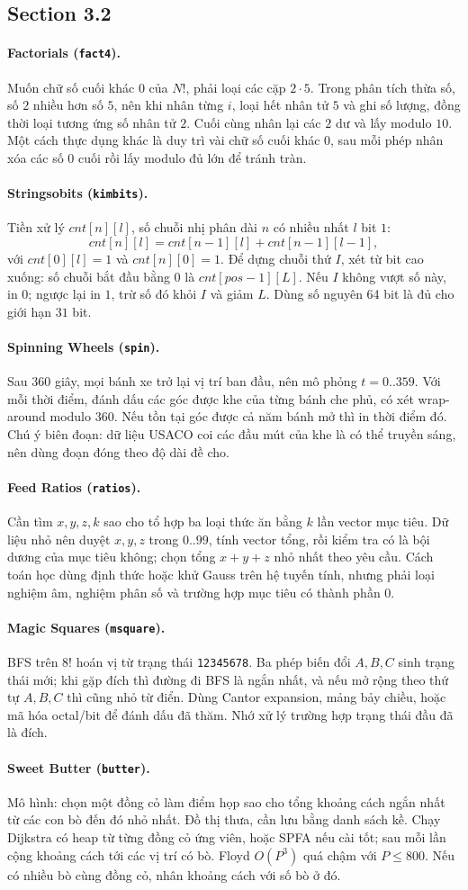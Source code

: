 \documentclass[11pt]{article}
\newcommand{\problem}[2]{\paragraph{#1 (\texttt{#2}).}}
\newcommand{\bigO}[1]{\ensuremath{O(#1)}}
\begin{document}
\subsection*{Section 3.2}

\problem{Factorials}{fact4}
Muốn chữ số cuối khác \(0\) của \(N!\), phải loại các cặp \(2\cdot5\). Trong phân tích thừa số, số \(2\) nhiều hơn số \(5\), nên khi nhân từng \(i\), loại hết nhân tử \(5\) và ghi số lượng, đồng thời loại tương ứng số nhân tử \(2\). Cuối cùng nhân lại các \(2\) dư và lấy modulo \(10\). Một cách thực dụng khác là duy trì vài chữ số cuối khác \(0\), sau mỗi phép nhân xóa các số \(0\) cuối rồi lấy modulo đủ lớn để tránh tràn.

\problem{Stringsobits}{kimbits}
Tiền xử lý \(cnt[n][l]\), số chuỗi nhị phân dài \(n\) có nhiều nhất \(l\) bit \(1\):
\[
  cnt[n][l]=cnt[n-1][l]+cnt[n-1][l-1],
\]
với \(cnt[0][l]=1\) và \(cnt[n][0]=1\). Để dựng chuỗi thứ \(I\), xét từ bit cao xuống: số chuỗi bắt đầu bằng \(0\) là \(cnt[pos-1][L]\). Nếu \(I\) không vượt số này, in \(0\); ngược lại in \(1\), trừ số đó khỏi \(I\) và giảm \(L\). Dùng số nguyên 64 bit là đủ cho giới hạn \(31\) bit.

\problem{Spinning Wheels}{spin}
Sau \(360\) giây, mọi bánh xe trở lại vị trí ban đầu, nên mô phỏng \(t=0..359\). Với mỗi thời điểm, đánh dấu các góc được khe của từng bánh che phủ, có xét wrap-around modulo \(360\). Nếu tồn tại góc được cả năm bánh mở thì in thời điểm đó. Chú ý biên đoạn: dữ liệu USACO coi các đầu mút của khe là có thể truyền sáng, nên dùng đoạn đóng theo độ dài đề cho.

\problem{Feed Ratios}{ratios}
Cần tìm \(x,y,z,k\) sao cho tổ hợp ba loại thức ăn bằng \(k\) lần vector mục tiêu. Dữ liệu nhỏ nên duyệt \(x,y,z\) trong \(0..99\), tính vector tổng, rồi kiểm tra có là bội dương của mục tiêu không; chọn tổng \(x+y+z\) nhỏ nhất theo yêu cầu. Cách toán học dùng định thức hoặc khử Gauss trên hệ tuyến tính, nhưng phải loại nghiệm âm, nghiệm phân số và trường hợp mục tiêu có thành phần \(0\).

\problem{Magic Squares}{msquare}
BFS trên \(8!\) hoán vị từ trạng thái \texttt{12345678}. Ba phép biến đổi \(A,B,C\) sinh trạng thái mới; khi gặp đích thì đường đi BFS là ngắn nhất, và nếu mở rộng theo thứ tự \(A,B,C\) thì cũng nhỏ từ điển. Dùng Cantor expansion, mảng bảy chiều, hoặc mã hóa octal/bit để đánh dấu đã thăm. Nhớ xử lý trường hợp trạng thái đầu đã là đích.

\problem{Sweet Butter}{butter}
Mô hình: chọn một đồng cỏ làm điểm họp sao cho tổng khoảng cách ngắn nhất từ các con bò đến đó nhỏ nhất. Đồ thị thưa, cần lưu bằng danh sách kề. Chạy Dijkstra có heap từ từng đồng cỏ ứng viên, hoặc SPFA nếu cài tốt; sau mỗi lần cộng khoảng cách tới các vị trí có bò. Floyd \(\bigO{P^3}\) quá chậm với \(P\le800\). Nếu có nhiều bò cùng đồng cỏ, nhân khoảng cách với số bò ở đó.
\end{document}
